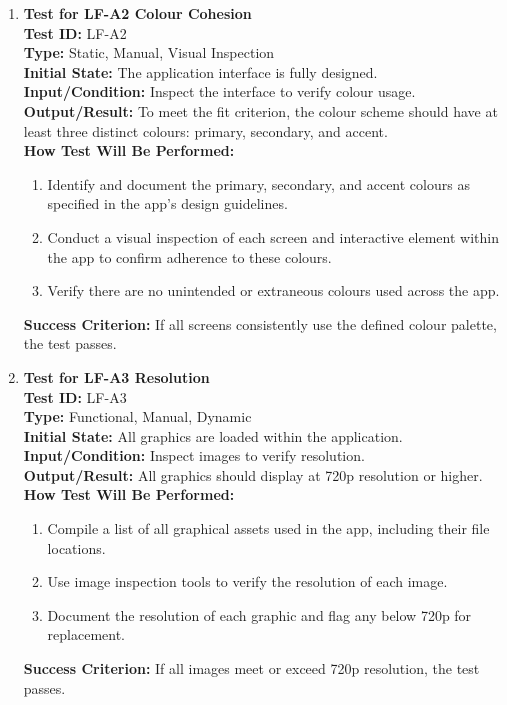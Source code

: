 \documentclass[12pt, titlepage]{article}
\begin{document}
\begin{enumerate}
    \item \textbf{Test for LF-A2 Colour Cohesion} \\
      \newline
      \textbf{Test ID:} LF-A2 \\
      \textbf{Type:} Static, Manual, Visual Inspection \\
      \textbf{Initial State:} The application interface is fully designed. \\
      \textbf{Input/Condition:} Inspect the interface to verify colour usage. \\
      \textbf{Output/Result:} To meet the fit criterion, the colour scheme should have at least three distinct colours: primary, secondary, and accent. \\
      \textbf{How Test Will Be Performed:}
      \begin{enumerate}
          \item Identify and document the primary, secondary, and accent colours as specified in the app's design guidelines.
          \item Conduct a visual inspection of each screen and interactive element within the app to confirm adherence to these colours.
          \item Verify there are no unintended or extraneous colours used across the app.
      \end{enumerate}
      \textbf{Success Criterion:} If all screens consistently use the defined colour palette, the test passes.

    \item \textbf{Test for LF-A3 Resolution} \\
      \newline
      \textbf{Test ID:} LF-A3 \\
      \textbf{Type:} Functional, Manual, Dynamic \\
      \textbf{Initial State:} All graphics are loaded within the application. \\
      \textbf{Input/Condition:} Inspect images to verify resolution. \\
      \textbf{Output/Result:} All graphics should display at 720p resolution or higher. \\
      \textbf{How Test Will Be Performed:}
      \begin{enumerate}
          \item Compile a list of all graphical assets used in the app, including their file locations.
          \item Use image inspection tools to verify the resolution of each image.
          \item Document the resolution of each graphic and flag any below 720p for replacement.
      \end{enumerate}
      \textbf{Success Criterion:} If all images meet or exceed 720p resolution, the test passes.


\end{enumerate}
\end{document}
